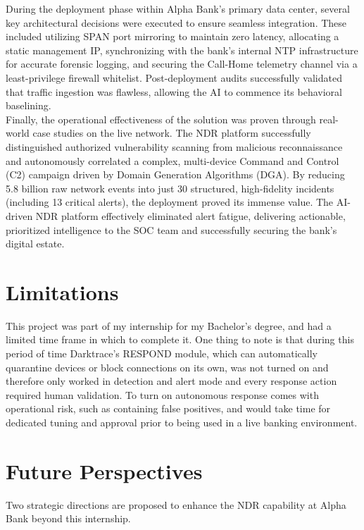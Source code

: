 \documentclass[12pt,a4paper]{report}
\begin{document}
During the deployment phase within Alpha Bank's primary data center, several key architectural decisions were executed to ensure seamless integration. These included utilizing SPAN port mirroring to maintain zero latency, allocating a static management IP, synchronizing with the bank's internal NTP infrastructure for accurate forensic logging, and securing the Call-Home telemetry channel via a least-privilege firewall whitelist. Post-deployment audits successfully validated that traffic ingestion was flawless, allowing the AI to commence its behavioral baselining.\\

Finally, the operational effectiveness of the solution was proven through real-world case studies on the live network. The NDR platform successfully distinguished authorized vulnerability scanning from malicious reconnaissance and autonomously correlated a complex, multi-device Command and Control (C2) campaign driven by Domain Generation Algorithms (DGA). By reducing 5.8 billion raw network events into just 30 structured, high-fidelity incidents (including 13 critical alerts), the deployment proved its immense value. The AI-driven NDR platform effectively eliminated alert fatigue, delivering actionable, prioritized intelligence to the SOC team and successfully securing the bank's digital estate.

\section*{Limitations}
This project was part of my internship for my Bachelor’s degree, and had a limited time frame in which to complete it. One thing to note is that during this period of time Darktrace’s RESPOND module, which can automatically quarantine devices or block connections on its own, was not turned on and therefore only worked in detection and alert mode and every response action required human validation. To turn on autonomous response comes with operational risk, such as containing false positives, and would take time for dedicated tuning and approval prior to being used in a live banking environment.

\section*{Future Perspectives}
Two strategic directions are proposed to enhance the NDR capability at Alpha Bank beyond this internship.\\
\end{document}
